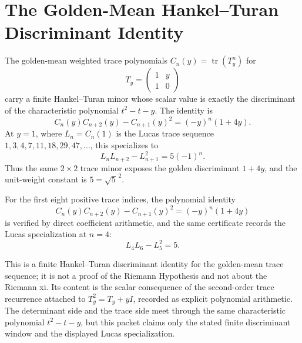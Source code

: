 \chapter{The Golden-Mean Hankel--Turan Discriminant Identity}
\label{ch:concrete-instances-window6-golden-mean-hankel-turan}

The golden-mean weighted trace polynomials $C_n(y)=\operatorname{tr}(T_y^n)$ for
$$
T_y=\begin{pmatrix}1&y\\1&0\end{pmatrix}
$$
carry a finite Hankel--Turan minor whose scalar value is exactly the discriminant of the characteristic polynomial $t^2-t-y$. The identity is
$$
C_n(y)C_{n+2}(y)-C_{n+1}(y)^2=(-y)^n(1+4y).
$$
At $y=1$, where $L_n=C_n(1)$ is the Lucas trace sequence $1,3,4,7,11,18,29,47,\ldots$, this specializes to
$$
L_nL_{n+2}-L_{n+1}^2=5(-1)^n.
$$
Thus the same $2\times2$ trace minor exposes the golden discriminant $1+4y$, and the unit-weight constant is $5=\sqrt{5}^{\,2}$.

\begin{theorem}
\label{thm:window6-golden-mean-hankel-turan}
For the first eight positive trace indices, the polynomial identity
$$
C_n(y)C_{n+2}(y)-C_{n+1}(y)^2=(-y)^n(1+4y)
$$
is verified by direct coefficient arithmetic, and the same certificate records the Lucas specialization at $n=4$:
$$
L_4L_6-L_5^2=5.
$$
\end{theorem}

This is a finite Hankel--Turan discriminant identity for the golden-mean trace sequence; it is not a proof of the Riemann Hypothesis and not about the Riemann xi. Its content is the scalar consequence of the second-order trace recurrence attached to $T_y^2=T_y+yI$, recorded as explicit polynomial arithmetic. The determinant side and the trace side meet through the same characteristic polynomial $t^2-t-y$, but this packet claims only the stated finite discriminant window and the displayed Lucas specialization.



